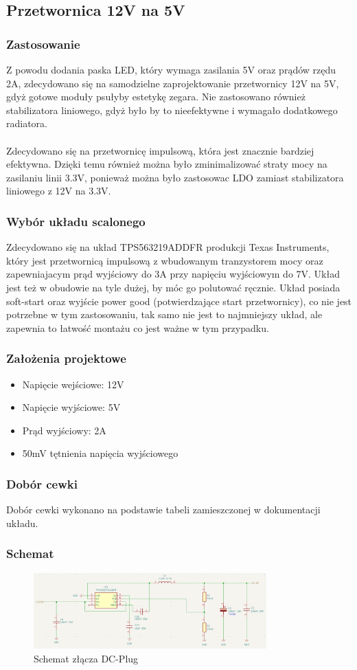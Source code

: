 \documentclass{article}
\begin{document}
\subsection{Przetwornica 12V na 5V}
\subsubsection{Zastosowanie}
Z powodu dodania paska LED, który wymaga zasilania 5V oraz prądów rzędu 2A, zdecydowano się na samodzielne zaprojektowanie przetwornicy 12V na 5V, gdyż gotowe moduły
psułyby estetykę zegara. Nie zastosowano również stabilizatora liniowego, gdyż było by to nieefektywne i wymagało dodatkowego radiatora.
\\\\
Zdecydowano się na przetwornicę impulsową, która jest znacznie bardziej efektywna. Dzięki temu również można było zminimalizować straty mocy na zasilaniu linii 3.3V, ponieważ
można było zastosowac LDO zamiast stabilizatora liniowego z 12V na 3.3V.

\subsubsection{Wybór układu scalonego}
Zdecydowano się na układ TPS563219ADDFR produkcji Texas Instruments, który jest przetwornicą impulsową z wbudowanym tranzystorem mocy oraz zapewniajacym prąd wyjściowy do 3A przy 
napięciu wyjściowym do 7V. Układ jest też w obudowie na tyle dużej, by móc go polutować ręcznie. Układ posiada soft-start oraz wyjście power good (potwierdzające start przetwornicy), co nie jest potrzebne w tym zastosowaniu, tak samo 
nie jest to najmniejszy układ, ale zapewnia to łatwość montażu co jest ważne w tym przypadku.

\subsubsection{Założenia projektowe}
\begin{itemize}
    \item Napięcie wejściowe: 12V
    \item Napięcie wyjściowe: 5V
    \item Prąd wyjściowy: 2A
    \item 50mV tętnienia napięcia wyjściowego
\end{itemize}

\subsubsection{Dobór cewki}
Dobór cewki wykonano na podstawie tabeli zamieszczonej w dokumentacji układu. 



\subsubsection{Schemat}
\begin{figure}[H]
    \centering
    \includegraphics[width=0.8\textwidth]{12V_to_5V_conv_schemat.png}
    \caption{Schemat złącza DC-Plug}
\end{figure}
\end{document}
